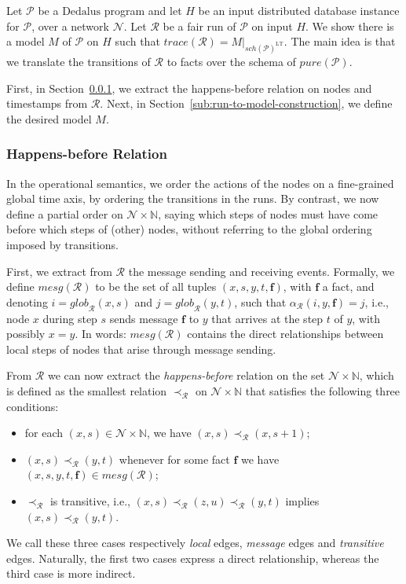 \documentclass{tlp}
\newcommand{\langname}[1]{\text{#1}}  \newcommand{\pred}[1]{\mathtt{#1}}  \newcommand{\fname}[1]{\mathit{#1}}  \newcommand{\sq}[1]{`{#1}'}
\newcommand{\dedalus}{\langname{Dedalus}}
\newcommand{\Nat}{\mathbb{N}}  \newcommand{\len}[1]{|#1|} \newcommand{\rom}[1]{\text{\emph{(#1)}}} \newcommand{\romI}{\rom i}
\newcommand{\ded}{\mathcal{P}}
\newcommand{\fc}{\boldsymbol{f}}
\newcommand{\proj}[2]{#1|_{#2}}
\newcommand{\schof}[1]{\fname{sch}(#1)}
\newcommand{\nw}{\mathcal{N}}
\newcommand{\toloct}[1]{#1^{\mathrm{LT}}}
\newcommand{\pure}[1]{\fname{pure}(#1)}
\newcommand{\run}{\mathcal{R}}
\newcommand{\trace}[1]{\fname{trace}(#1)}
\newcommand{\globR}[1]{\fname{glob}_{\run}(#1)}
\newcommand{\nwnat}{\nw\times\Nat}
\newcommand{\arr}{\alpha_{\run}}
\newcommand{\caus}{\prec_{\run}}
\newcommand{\mesgev}[1]{\fname{mesg}(#1)}
\begin{document}
\label{sub:run-to-model}

Let $\ded$ be a $\dedalus$ program and let $H$ be an input distributed
database instance for $\ded$, over a network $\nw$. Let $\run$
be a fair run of $\ded$ on input $H$. We show there is a model $M$
of $\ded$ on $H$ such that $\trace{\run}=\proj M{\toloct{\schof{\ded}}}$.
The main idea is that we translate the transitions of $\run$ to facts
over the schema of $\pure{\ded}$. 

First, in Section~\ref{sub:run-happens-before}, we extract the happens-before
relation on nodes and timestamps from $\run$. Next, in Section~\ref{sub:run-to-model-construction},
we define the desired model $M$.


\subsubsection{Happens-before Relation}

\label{sub:run-happens-before}

In the operational semantics, we order the actions of the nodes on
a fine-grained global time axis, by ordering the transitions in the
runs. By contrast, we now define a partial order on $\nwnat$, saying
which steps of nodes must have come before which steps of (other)
nodes, without referring to the global ordering imposed by transitions. 

First, we extract from $\run$ the message sending and receiving events.
Formally, we define $\mesgev{\run}$ to be the set of all tuples $(x,s,y,t,\fc)$,
with $\fc$ a fact, and denoting $i=\globR{x,s}$ and $j=\globR{y,t}$,
such that $\arr(i,y,\fc)=j$, i.e., node $x$ during step $s$ sends
message $\fc$ to $y$ that arrives at the step $t$ of $y$, with
possibly $x=y$. In words: $\mesgev{\run}$ contains the direct relationships
between local steps of nodes that arise through message sending. 

From $\run$ we can now extract the \emph{happens-before} relation
\cite{attiyawelch_dcbook} on the set $\nwnat$, which is defined
as the smallest relation $\caus$ on $\nwnat$ that satisfies the
following three conditions:
\begin{itemize}
\item for each $(x,s)\in\nwnat$, we have $(x,s)\caus(x,s+1)$;
\item $(x,s)\caus(y,t)$ whenever for some fact $\fc$ we have $(x,s,y,t,\fc)\in\mesgev{\run}$;
\item $\caus$ is transitive, i.e., $(x,s)\caus(z,u)\caus(y,t)$ implies
$(x,s)\caus(y,t)$.
\end{itemize}
We call these three cases respectively \emph{local} edges, \emph{message}
edges and \emph{transitive} edges. Naturally, the first two cases
express a direct relationship, whereas the third case is more indirect.
\end{document}
